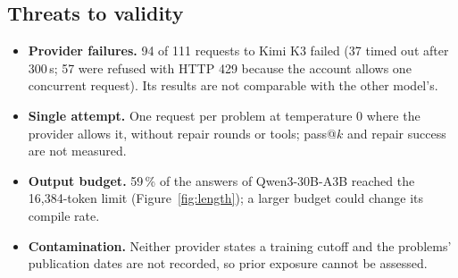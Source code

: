 \documentclass[11pt]{article}
\begin{document}
\subsection*{Threats to validity}
\begin{itemize}\setlength\itemsep{2pt}

\item \textbf{Provider failures.} 94 of 111 requests to Kimi K3 failed (37 timed out after 300\,s; 57 were refused with HTTP 429 because the account allows one concurrent request). Its results are not comparable with the other model's.
\item \textbf{Single attempt.} One request per problem at temperature 0 where the provider allows it, without repair rounds or tools; pass@$k$ and repair success are not measured.
\item \textbf{Output budget.} 59\,\% of the answers of Qwen3-30B-A3B reached the 16{,}384-token limit (Figure~\ref{fig:length}); a larger budget could change its compile rate.
\item \textbf{Contamination.} Neither provider states a training cutoff and the problems' publication dates are not recorded, so prior exposure cannot be assessed.
\end{itemize}
\end{document}
